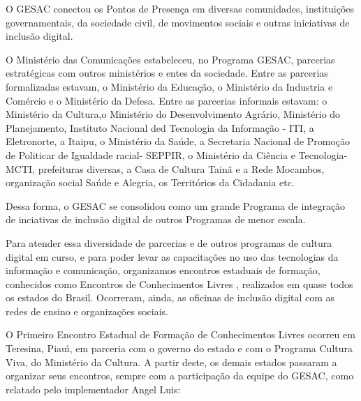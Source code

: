 \documentclass[
12pt,		%
openright,	%
twoside,  %
a4paper,			%
chapter=TITLE,		%
english,			%
french,				%
spanish,			%
brazil				%
]{USPSC-classe/USPSC}
\begin{document}
O GESAC conectou os Pontos de Presen\c{c}a em diversas comunidades, institui\c{c}\~oes governamentais, da sociedade civil, de movimentos sociais e outras iniciativas de inclus\~ao digital.









O Minist\'erio das Comunica\c{c}\~oes estabeleceu, no Programa GESAC, parcerias estrat\'egicas com outros minist\'erios e entes da sociedade. Entre as parcerias formalizadas estavam, o Minist\'erio da Educa\c{c}\~ao, o Minist\'erio da Industria e Com\'ercio e o Minist\'erio da Defesa. Entre as parcerias informais estavam: o Minist\'erio da Cultura,o Minist\'erio do Desenvolvimento Agr\'ario, Minist\'erio do Planejamento, Instituto  Nacional ded Tecnologia da Informa\c{c}\~ao - ITI,  a Eletronorte, a Itaipu, o Minist\'erio da Sa\'ude, a Secretaria Nacional de Promo\c{c}\~ao de Politicar de Igualdade racial- SEPPIR, o Minist\'erio da Ci\^encia e Tecnologia-MCTI,  prefeituras diversas, a Casa de Cultura Tain\~a e a Rede Mocambos, organiza\c{c}\~ao social \textquotedbl Sa\'ude e Alegria\textquotedbl , os Territ\'orios da Cidadania etc.









Dessa forma, o GESAC se consolidou como um grande Programa de integra\c{c}\~ao de inciativas de inclus\~ao digital de outros Programas de menor escala.









Para atender essa diversidade de parcerias e de outros programas de cultura digital em curso, e para poder levar as capacita\c{c}\~oes no uso das tecnologias da informa\c{c}\~ao e comunica\c{c}\~ao, organizamos encontros estaduais de forma\c{c}\~ao, conhecidos como \textquotedbl Encontros de Conhecimentos Livres \textquotedbl , realizados em  quase todos os estados do Brasil. Ocorreram, ainda, as  oficinas de inclus\~ao digital com as redes de ensino e organiza\c{c}\~oes sociais.









O \textquotedbl Primeiro Encontro Estadual de Forma\c{c}\~ao de Conhecimentos Livres \textquotedbl  ocorreu em  Teresina, Piau\'{\i}, em parceria com o governo do estado e com  o Programa Cultura Viva, do Minist\'erio da Cultura. A partir deste, os demais estados passaram a organizar seus encontros, sempre com a participa\c{c}\~ao da equipe do GESAC, como relatado pelo implementador Angel Luis:
\end{document}
